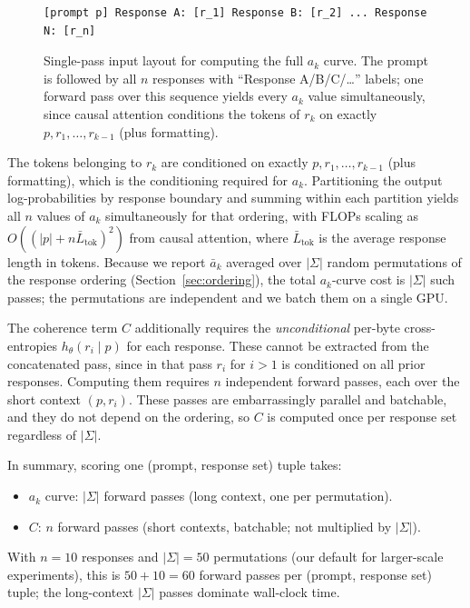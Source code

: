 \begin{figure}[t]
\centering
\begin{verbatim}
[prompt p] Response A: [r_1] Response B: [r_2] ... Response N: [r_n]
\end{verbatim}
\caption{Single-pass input layout for computing the full $a_k$ curve.
The prompt is followed by all $n$ responses with ``Response A/B/C/\ldots'' labels; one forward pass over this sequence yields every $a_k$ value simultaneously, since causal attention conditions the tokens of $r_k$ on exactly $p, r_1, \ldots, r_{k-1}$ (plus formatting).}
\label{fig:single-pass-layout}
\end{figure}
The tokens belonging to $r_k$ are conditioned on exactly $p, r_1, \ldots, r_{k-1}$ (plus formatting), which is the conditioning required for $a_k$.
Partitioning the output log-probabilities by response boundary and summing within each partition yields all $n$ values of $a_k$ simultaneously for that ordering, with FLOPs scaling as $O((|p| + n\bar{L}_{\mathrm{tok}})^2)$ from causal attention, where $\bar{L}_{\mathrm{tok}}$ is the average response length in tokens.
Because we report $\bar{a}_k$ averaged over $|\Sigma|$ random permutations of the response ordering (Section~\ref{sec:ordering}), the total $a_k$-curve cost is $|\Sigma|$ such passes; the permutations are independent and we batch them on a single GPU.

The coherence term $C$ additionally requires the \emph{unconditional} per-byte cross-entropies $h_\theta(r_i \mid p)$ for each response.
These cannot be extracted from the concatenated pass, since in that pass $r_i$ for $i > 1$ is conditioned on all prior responses.
Computing them requires $n$ independent forward passes, each over the short context $(p, r_i)$.
These passes are embarrassingly parallel and batchable, and they do not depend on the ordering, so $C$ is computed once per response set regardless of $|\Sigma|$.

In summary, scoring one (prompt, response set) tuple takes:
\begin{itemize}[nosep]
    \item $a_k$ curve: $|\Sigma|$ forward passes (long context, one per permutation).
    \item $C$: $n$ forward passes (short contexts, batchable; not multiplied by $|\Sigma|$).
\end{itemize}
With $n = 10$ responses and $|\Sigma| = 50$ permutations (our default for larger-scale experiments), this is $50 + 10 = 60$ forward passes per (prompt, response set) tuple; the long-context $|\Sigma|$ passes dominate wall-clock time.

